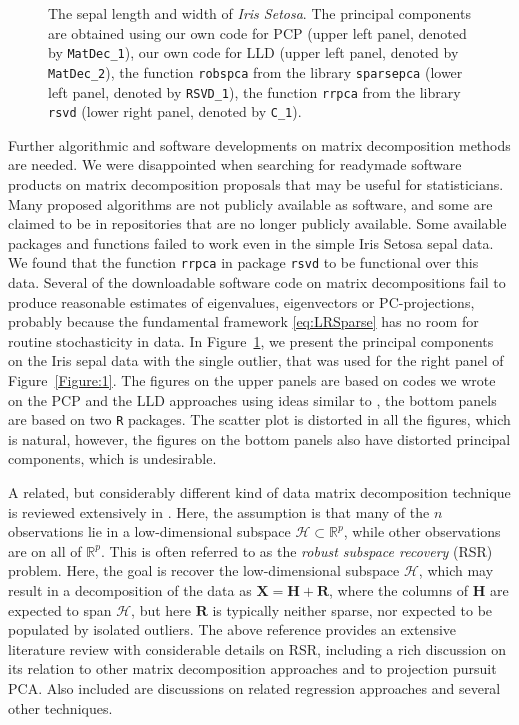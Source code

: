 \documentclass[ss]{imsart}
\newcommand{\BR}{{\mathbb{R}}}
\newcommand{\cH}{\mathcal{H}}
\newcommand{\vecH}{{\mathbf {H}}}
\newcommand{\vecR}{{\mathbf {R}}}
\newcommand{\vecX}{{\mathbf {X}}}
\theoremstyle{Example}
\begin{document}
\begin{figure}
\begin{center}
\begin{tabular}{cc}
\end{tabular}
\end{center}
\caption{The sepal length and width of \textit{Iris Setosa}. The principal components are obtained using 
our own code for PCP
(upper left panel, denoted by \texttt{MatDec\_1}), 
our own code for LLD
(upper left panel, denoted by \texttt{MatDec\_2}), 
the function \texttt{robspca} from the library \texttt{sparsepca} 
(lower left panel, denoted by \texttt{RSVD\_1}), 
the function \texttt{rrpca} from the library \texttt{rsvd}
(lower right panel, denoted by \texttt{C\_1}). 
}
\label{Figure:MatDec_PCA}
\end{figure}

Further algorithmic and software developments on matrix decomposition methods are needed. We were disappointed when searching for readymade software products on matrix decomposition proposals that may be useful for statisticians. Many proposed algorithms are not publicly available as software, and some are claimed to be in repositories that are no longer publicly available. Some available packages and functions failed to work even in the simple Iris Setosa sepal data. We found that the function \texttt{rrpca} in package \texttt{rsvd} to be functional over this data. Several of the downloadable software code  on matrix decompositions fail  to produce reasonable estimates of eigenvalues, eigenvectors or PC-projections, probably because the fundamental framework \eqref{eq:LRSparse} has no room for routine stochasticity in data.  In Figure~\ref{Figure:MatDec_PCA}, we present the principal components on the Iris sepal data with the single outlier, that was used for the right panel of Figure~\ref{Figure:1}. The figures on the upper panels are based on codes we wrote on the PCP and the LLD approaches using ideas similar to \cite{ref:NIPS164152_PCA_SGD}, the bottom panels are based on two \texttt{R} packages. The scatter plot is distorted in all the figures, which is natural,  however, the figures on the bottom panels also have distorted principal components, which is undesirable. 


A related, but considerably different kind of data matrix decomposition technique is reviewed extensively in \cite{ref:ProceedingsIEEE181380_RPCA_Lerman_Review}. Here, the assumption is that many of the $n$ observations lie in a low-dimensional subspace $\cH \subset \BR^{p}$, while other observations are on all of $\BR^{p}$. This is often referred to as the \textit{robust subspace recovery} (RSR) problem.
Here, the goal is recover the low-dimensional subspace $\cH$, which may result in a decomposition of the data as ${\vecX} = \vecH + \vecR$, where the columns of $\vecH$ are expected to span $\cH$, but here $\vecR$ is typically neither sparse, nor expected to be populated by isolated outliers. The above reference provides an extensive literature review with considerable details on RSR, including a rich discussion on its relation to other matrix decomposition approaches and to projection pursuit PCA. Also included are discussions on related regression approaches and several other techniques.
\end{document}
